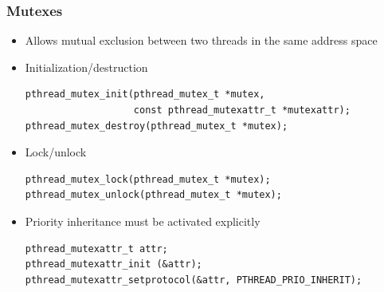 \begin{frame}[fragile]
  \frametitle{Mutexes}
  \begin{itemize}
  \item Allows mutual exclusion between two threads in the same
    address space
  \item Initialization/destruction
    \begin{block}{}
\footnotesize
\begin{verbatim}
pthread_mutex_init(pthread_mutex_t *mutex,
                   const pthread_mutexattr_t *mutexattr);
pthread_mutex_destroy(pthread_mutex_t *mutex);
\end{verbatim}
\normalsize
    \end{block}
  \item Lock/unlock
    \begin{block}{}
\footnotesize
\begin{verbatim}
pthread_mutex_lock(pthread_mutex_t *mutex);
pthread_mutex_unlock(pthread_mutex_t *mutex);
\end{verbatim}
\normalsize
    \end{block}
  \item Priority inheritance must be activated explicitly
    \begin{block}{}
\footnotesize
\begin{verbatim}
pthread_mutexattr_t attr;
pthread_mutexattr_init (&attr);
pthread_mutexattr_setprotocol(&attr, PTHREAD_PRIO_INHERIT);
\end{verbatim}
\normalsize
    \end{block}
  \end{itemize}
\end{frame}

